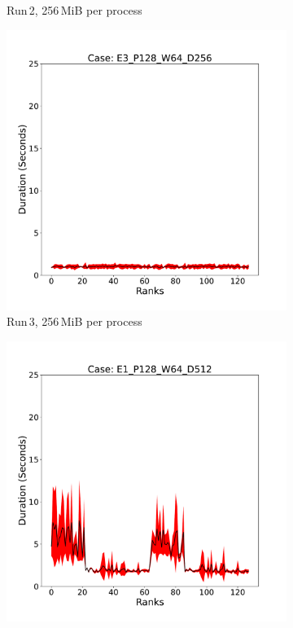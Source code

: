 \begin{figure}[h!]
\begin{subfigure}[b]{0.3\textwidth}
         \caption{Run\,2, 256\,MiB per process}
         \label{fig:E2_256_d11}
     \end{subfigure}
      \hfill
     \begin{subfigure}[b]{0.3\textwidth}
         \centering
         \includegraphics[width=\textwidth, height=\textwidth]{figures/deisa1__E3_P128_W64_D256.pdf}
         \caption{Run\,3, 256\,MiB per process}
         \label{fig:E3_256_d11}
     \end{subfigure}
     \vfill
          \begin{subfigure}[b]{0.3\textwidth}
         \centering
         \includegraphics[width=\textwidth, height=\textwidth]{figures/deisa1__E1_P128_W64_D512.pdf}

\end{subfigure}
\end{figure}
